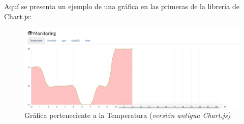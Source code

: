 Aquí se presenta un ejemplo de una gráfica en las primeras de la librería de Chart.js:

\begin{figure}[!h]
	\centering
	\includegraphics[width=0.7\linewidth]{figuras/charjs}
	\caption{Gráfica perteneciente a la Temperatura (\textit{versión antigua Chart.js)}}
	\label{fig:nodereport}
\end{figure}



